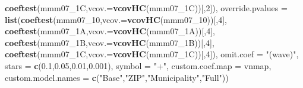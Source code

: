 \documentclass[
]{article}
\newenvironment{Shaded}{\begin{snugshade}}{\end{snugshade}}
\newcommand{\DataTypeTok}[1]{\textcolor[rgb]{0.13,0.29,0.53}{#1}}
\newcommand{\DecValTok}[1]{\textcolor[rgb]{0.00,0.00,0.81}{#1}}
\newcommand{\FloatTok}[1]{\textcolor[rgb]{0.00,0.00,0.81}{#1}}
\newcommand{\KeywordTok}[1]{\textcolor[rgb]{0.13,0.29,0.53}{\textbf{#1}}}
\newcommand{\NormalTok}[1]{#1}
\newcommand{\StringTok}[1]{\textcolor[rgb]{0.31,0.60,0.02}{#1}}
\begin{document}
\begin{Shaded}
\begin{Highlighting}[]
                             \KeywordTok{coeftest}\NormalTok{(mmm07_1C,}\DataTypeTok{vcov.=}\KeywordTok{vcovHC}\NormalTok{(mmm07_1C))[,}\DecValTok{2}\NormalTok{]),}
          \DataTypeTok{override.pvalues =} \KeywordTok{list}\NormalTok{(}\KeywordTok{coeftest}\NormalTok{(mmm07_}\DecValTok{10}\NormalTok{,}\DataTypeTok{vcov.=}\KeywordTok{vcovHC}\NormalTok{(mmm07_}\DecValTok{10}\NormalTok{))[,}\DecValTok{4}\NormalTok{],}
                                  \KeywordTok{coeftest}\NormalTok{(mmm07_1A,}\DataTypeTok{vcov.=}\KeywordTok{vcovHC}\NormalTok{(mmm07_1A))[,}\DecValTok{4}\NormalTok{],}
                                  \KeywordTok{coeftest}\NormalTok{(mmm07_1B,}\DataTypeTok{vcov.=}\KeywordTok{vcovHC}\NormalTok{(mmm07_1B))[,}\DecValTok{4}\NormalTok{],}
                                  \KeywordTok{coeftest}\NormalTok{(mmm07_1C,}\DataTypeTok{vcov.=}\KeywordTok{vcovHC}\NormalTok{(mmm07_1C))[,}\DecValTok{4}\NormalTok{]),}
          \DataTypeTok{omit.coef =} \StringTok{"(wave)"}\NormalTok{, }\DataTypeTok{stars =} \KeywordTok{c}\NormalTok{(}\FloatTok{0.1}\NormalTok{,}\FloatTok{0.05}\NormalTok{,}\FloatTok{0.01}\NormalTok{,}\FloatTok{0.001}\NormalTok{), }\DataTypeTok{symbol =} \StringTok{"+"}\NormalTok{,}
          \DataTypeTok{custom.coef.map =}\NormalTok{ vnmap, }
          \DataTypeTok{custom.model.names =} \KeywordTok{c}\NormalTok{(}\StringTok{"Base"}\NormalTok{,}\StringTok{"ZIP"}\NormalTok{,}\StringTok{"Municipality"}\NormalTok{,}\StringTok{"Full"}\NormalTok{))}
\end{Highlighting}
\end{Shaded}
\end{document}
